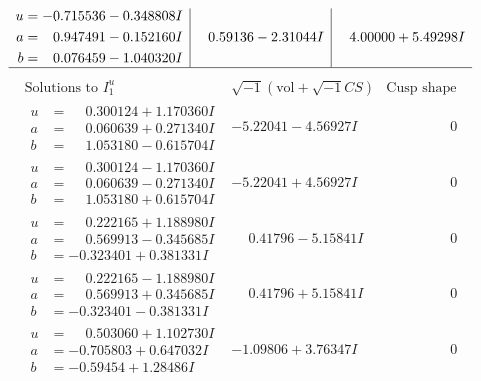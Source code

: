 \documentclass[1p]{elsarticle_modified}
\theoremstyle{definition}
\newcommand{\I}{\sqrt{-1}}
\begin{document}
$$\begin{array}{c|c|c}
\begin{aligned}
u &= -0.715536 - 0.348808 I \\
a &= \phantom{-}0.947491 - 0.152160 I \\
b &= \phantom{-}0.076459 - 1.040320 I\end{aligned}
 & \phantom{-}0.59136 - 2.31044 I & \phantom{-}4.00000 + 5.49298 I\\
 \hline 
 \end{array}$$\newpage$$\begin{array}{c|c|c}  
\text{Solutions to }I^u_{1}& \I (\text{vol} + \sqrt{-1}CS) & \text{Cusp shape}\\
 \hline 
\begin{aligned}
u &= \phantom{-}0.300124 + 1.170360 I \\
a &= \phantom{-}0.060639 + 0.271340 I \\
b &= \phantom{-}1.053180 - 0.615704 I\end{aligned}
 & -5.22041 - 4.56927 I & \phantom{-0.000000 } 0 \\ \hline\begin{aligned}
u &= \phantom{-}0.300124 - 1.170360 I \\
a &= \phantom{-}0.060639 - 0.271340 I \\
b &= \phantom{-}1.053180 + 0.615704 I\end{aligned}
 & -5.22041 + 4.56927 I & \phantom{-0.000000 } 0 \\ \hline\begin{aligned}
u &= \phantom{-}0.222165 + 1.188980 I \\
a &= \phantom{-}0.569913 - 0.345685 I \\
b &= -0.323401 + 0.381331 I\end{aligned}
 & \phantom{-}0.41796 - 5.15841 I & \phantom{-0.000000 } 0 \\ \hline\begin{aligned}
u &= \phantom{-}0.222165 - 1.188980 I \\
a &= \phantom{-}0.569913 + 0.345685 I \\
b &= -0.323401 - 0.381331 I\end{aligned}
 & \phantom{-}0.41796 + 5.15841 I & \phantom{-0.000000 } 0 \\ \hline\begin{aligned}
u &= \phantom{-}0.503060 + 1.102730 I \\
a &= -0.705803 + 0.647032 I \\
b &= -0.59454 + 1.28486 I\end{aligned}
 & -1.09806 + 3.76347 I & \phantom{-0.000000 } 0 \\ \hline\begin{aligned}

\end{aligned}
\end{array}$$
\end{document}
